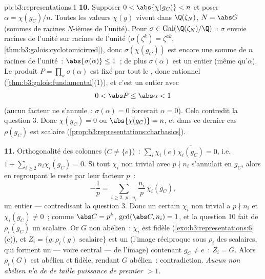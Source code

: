 \begin{solution}{pb:b3:representations:1}
\textbf{10.} Supposer $0 < \abs{\chi(g_C)} < n$ et poser
$\alpha = \chi(g_C)/n$. Toutes les valeurs $\chi(g)$ vivent
dans $\Q(\zeta_N)$, $N = \abs G$ (sommes de racines $N$-ièmes
de l'unité). Pour $\sigma \in
\operatorname{Gal}(\Q(\zeta_N)/\Q)$~: $\sigma$ envoie racines
de l'unité sur racines de l'unité ($\sigma(\zeta^k) =
\zeta^{ak}$, \cref{thm:b3:galois:cyclotomicirred}), donc
$\sigma(\chi(g_C))$ est encore une somme de $n$ racines de
l'unité~: $\abs{\sigma(\alpha)} \leq 1$~; de plus
$\sigma(\alpha)$ est un entier  (même  qu'$\alpha$). Le produit $P = \prod_\sigma
\sigma(\alpha)$ est fixé par tout le , donc
rationnel (\cref{thm:b3:galois:fundamental}(1)), et c'est un
entier  avec
\[
0 < \abs P \leq \abs\alpha < 1
\]
(aucun facteur ne s'annule~: $\sigma(\alpha) = 0$ forcerait
$\alpha = 0$). Cela contredit la question 3. Donc $\chi(g_C) =
0$ ou $\abs{\chi(g_C)} = n$, et dans ce dernier cas $\rho(g_C)$
est scalaire (\cref{prop:b3:representations:charbasics}).

\textbf{11.} Orthogonalité des colonnes ($C \neq \{e\}$)~:
$\sum_i \chi_i(e)\overline{\chi_i(g_C)} = 0$, i.e.\ $1 +
\sum_{i \geq 2} n_i\overline{\chi_i(g_C)} = 0$. Si tout
$\chi_i$ non trivial avec $p \nmid n_i$ s'annulait en $g_C$,
alors en regroupant le reste par leur facteur $p$~:
\[
-\frac1p = \sum_{i \geq 2,\ p \mid n_i}
\frac{n_i}{p}\,\overline{\chi_i(g_C)},
\]
un entier  --- contredisant la question 3. Donc un
certain $\chi_i$ non trivial a $p \nmid n_i$ et $\chi_i(g_C)
\neq 0$~; comme $\abs C = p^k$, $\gcd(\abs C, n_i) = 1$, et la
question 10 fait de $\rho_i(g_C)$ un scalaire. Or $G$  non
abélien~: $\chi_i$ est fidèle
(\cref{exo:b3:representations:6}(c)), et $Z_i = \{g :
\rho_i(g) \text{ scalaire}\}$ est un 
(l'image réciproque sous $\rho_i$ des scalaires, qui forment un
 --- voire central --- de l'image) contenant
$g_C \neq e$~: $Z_i = G$. Alors $\rho_i(G)$ est abélien et
fidèle, rendant $G$ abélien~: contradiction. \emph{Aucun  non abélien n'a de  de taille
puissance de premier $> 1$.}


\end{solution}
